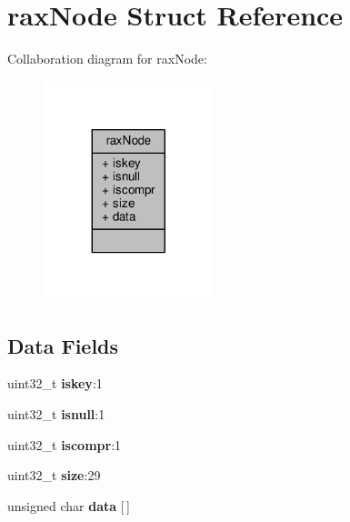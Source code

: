\hypertarget{structraxNode}{}\section{rax\+Node Struct Reference}
\label{structraxNode}


Collaboration diagram for rax\+Node\+:\nopagebreak
\begin{figure}[H]
\begin{center}
\leavevmode
\includegraphics[width=140pt]{structraxNode__coll__graph}
\end{center}
\end{figure}
\subsection*{Data Fields}
\begin{DoxyCompactItemize}
\item 
\mbox{\label{structraxNode_a868f1a97afbb0adb2a54614055ad37b6}} 
uint32\+\_\+t {\bfseries iskey}\+:1
\item 
\mbox{\label{structraxNode_a4547d7b800bc1dac851b451547fec124}} 
uint32\+\_\+t {\bfseries isnull}\+:1
\item 
\mbox{\label{structraxNode_acc78828f83997d2e4466fcd83c151ea4}} 
uint32\+\_\+t {\bfseries iscompr}\+:1
\item 
\mbox{\label{structraxNode_a117110a25eb5d984b5b6a470eb25222c}} 
uint32\+\_\+t {\bfseries size}\+:29
\item 
\mbox{\label{structraxNode_a1a15402433f80b23310c4a11396b3fda}} 
unsigned char {\bfseries data} \mbox{[}$\,$\mbox{]}
\end{DoxyCompactItemize}


